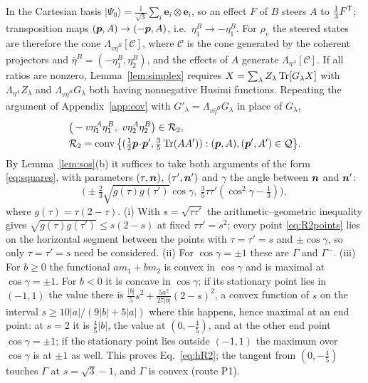 In the Cartesian basis $|\Psi_0\rangle=\tfrac1{\sqrt3}\sum_i\bm{e}_i\otimes\bm{e}_i$, so an effect $F$ of $B$ steers $A$ to $\tfrac13F^{\mathsf{T}}$; transposition maps $(\bm{p},A)\to(-\bm{p},A)$, i.e.\ $\eta_1^B\to-\eta_1^B$. For $\rho_v$ the steered states are therefore the cone $\Lambda_{v\bar\eta^B}[\mathcal{C}]$, where $\mathcal{C}$ is the cone generated by the coherent projectors and $\bar\eta^B=(-\eta_1^B,\eta_2^B)$, and the effects of $A$ generate $\Lambda_{\eta^A}[\mathcal{C}]$. If all ratios are nonzero, Lemma~\ref{lem:simplex} requires $X=\sum_\lambda Z_\lambda\operatorname{Tr}[G_\lambda X]$ with $\Lambda_{\eta^A}Z_\lambda$ and $\Lambda_{v\bar\eta^B}G_\lambda$ both having nonnegative Husimi functions. Repeating the argument of Appendix~\ref{app:cov} with $G'_\lambda=\Lambda_{v\bar\eta^B}G_\lambda$ in place of $G_\lambda$,
\begin{equation}
\begin{aligned}
&\big(-v\eta_1^A\eta_1^B,\ v\eta_2^A\eta_2^B\big)\in\mathcal{R}_2,\\
&\mathcal{R}_2=\operatorname{conv}\big\{(\tfrac12\bm{p}\!\cdot\!\bm{p}',\tfrac35\operatorname{Tr}(AA')):(\bm{p},A),(\bm{p}',A')\in\mathcal{Q}\big\}.
\end{aligned}
\end{equation}
By Lemma~\ref{lem:sos}(b) it suffices to take both arguments of the form \eqref{eq:squares}, with parameters $(\tau,\bm{n})$, $(\tau',\bm{n}')$ and $\gamma$ the angle between $\bm{n}$ and $\bm{n}'$:
\begin{equation}
\big(\pm\tfrac23\sqrt{g(\tau)g(\tau')}\cos\gamma,\ \tfrac35\tau\tau'(\cos^2\!\gamma-\tfrac13)\big),
\label{eq:R2points}
\end{equation}
where $g(\tau)=\tau(2-\tau)$.
(i) With $s=\sqrt{\tau\tau'}$ the arithmetic--geometric inequality gives $\sqrt{g(\tau)g(\tau')}\le s(2-s)$ at fixed $\tau\tau'=s^2$; every point \eqref{eq:R2points} lies on the horizontal segment between the points with $\tau=\tau'=s$ and $\pm\cos\gamma$, so only $\tau=\tau'=s$ need be considered. (ii) For $\cos\gamma=\pm1$ these are $\Gamma$ and $\Gamma^-$. (iii) For $b\ge0$ the functional $am_1+bm_2$ is convex in $\cos\gamma$ and is maximal at $\cos\gamma=\pm1$. For $b<0$ it is concave in $\cos\gamma$; if its stationary point lies in $(-1,1)$ the value there is $\tfrac{|b|}{5}s^2+\tfrac{5a^2}{27|b|}(2-s)^2$, a convex function of $s$ on the interval $s\ge10|a|/(9|b|+5|a|)$ where this happens, hence maximal at an end point: at $s=2$ it is $\tfrac45|b|$, the value at $(0,-\tfrac45)$, and at the other end point $\cos\gamma=\pm1$; if the stationary point lies outside $(-1,1)$ the maximum over $\cos\gamma$ is at $\pm1$ as well. This proves Eq.~\eqref{eq:hR2}; the tangent from $(0,-\tfrac45)$ touches $\Gamma$ at $s=\sqrt3-1$, and $\Gamma$ is convex (route P1).

